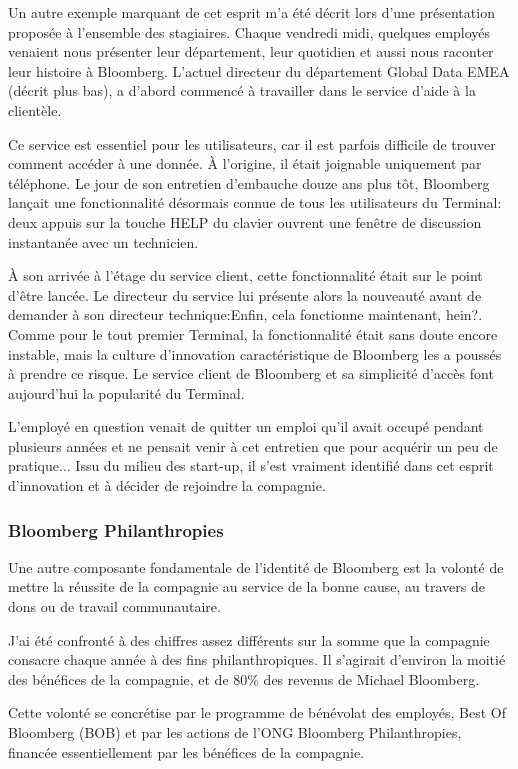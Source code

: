 \documentclass[11pt, oneside, titlepage, a4paper]{article}
\begin{document}
Un autre exemple marquant de cet esprit m'a été décrit lors d'une présentation proposée à l'ensemble des stagiaires. Chaque vendredi midi, quelques employés venaient nous présenter leur département, leur quotidien et aussi nous raconter leur histoire à Bloomberg. L'actuel directeur du département Global Data EMEA (décrit plus bas), a d'abord commencé à travailler dans le service d'aide à la clientèle.

Ce service est essentiel pour les utilisateurs, car il est parfois difficile de trouver comment accéder à une donnée. À l'origine, il était joignable uniquement par téléphone. Le jour de son entretien d'embauche douze ans plus tôt, Bloomberg lançait une fonctionnalité désormais connue de tous les utilisateurs du Terminal: deux appuis sur la touche HELP du clavier ouvrent une fenêtre de discussion instantanée avec un technicien.

À son arrivée à l'étage du service client, cette fonctionnalité était sur le point d'être lancée. Le directeur du service lui présente alors la nouveauté avant de demander à son directeur technique:\og Enfin, cela fonctionne maintenant, hein?\fg{}. Comme pour le tout premier Terminal, la fonctionnalité était sans doute encore instable, mais la culture d'innovation caractéristique de Bloomberg les a poussés à prendre ce risque. Le service client de Bloomberg et sa simplicité d'accès font aujourd'hui la popularité du Terminal.

L'employé en question venait de quitter un emploi qu'il avait occupé pendant plusieurs années et ne pensait venir à cet entretien que pour acquérir un peu de pratique... Issu du milieu des start-up, il s'est vraiment identifié dans cet esprit d'innovation et à décider de rejoindre la compagnie.
		\subsubsection{Bloomberg Philanthropies}
Une autre composante fondamentale de l'identité de Bloomberg est la volonté de mettre la réussite de la compagnie au service de la bonne cause, au travers de dons ou de travail communautaire.

J'ai été confronté à des chiffres assez différents sur la somme que la compagnie consacre chaque année à des fins philanthropiques. Il s'agirait d'environ la moitié des bénéfices de la compagnie, et de 80\% des revenus de Michael Bloomberg.

Cette volonté se concrétise par le programme de bénévolat des employés, Best Of Bloomberg (BOB) et par les actions de l'ONG Bloomberg Philanthropies, financée essentiellement par les bénéfices de la compagnie.
\\
\end{document}
